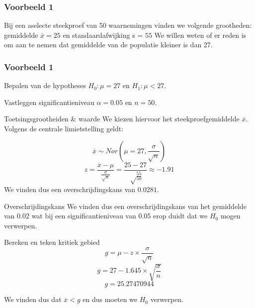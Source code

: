 \begin{frame}
	\frametitle{Voorbeeld 1}
	Bij een aselecte steekproef van 50 waarnemingen vinden we volgende grootheden: gemiddelde $\overline{x} = 25$ en standaardafwijking s = $55$
	We willen weten of er reden is om aan te nemen dat gemiddelde van de populatie kleiner is dan 27.
	
\end{frame}

\begin{frame}
	\frametitle{Voorbeeld 1}
	\begin{block}{Bepalen van de hypotheses}
		$H_{0} : \mu = 27$ en $H_{1}: \mu < 27$.
	\end{block}
	
	
	\begin{block}{Vastleggen significantieniveau}
		$\alpha = 0.05$ en $n=50$.
	\end{block}
	
	
	\begin{block}{Toetsingsgrootheiden \& waarde}
		We kiezen hiervoor het steekproefgemiddelde $\overline{x}$. Volgens de centrale limietstelling geldt:
		
		\[ \overline{x} \sim Nor(\mu = 27, \frac{\sigma}{\sqrt{n}}) \]
		\[ z = \frac{\overline{x} - \mu}{\frac{\sigma}{\sqrt{n}}} = \frac{25-27}{\sqrt\frac{55}{50}} \approx -1.91\]
		We vinden dus een overschrijdingskans van $0.0281$.
	\end{block}
\end{frame}

\begin{frame}
	\begin{block}{Overschrijdingskans}
		We vinden dus een overschrijdingskans van het gemiddelde van $0.02$ wat bij een significantieniveau van 0.05 erop duidt dat we $H_{0}$ mogen verwerpen.
	\end{block}
	
	\begin{block}{Bereken en teken kritiek gebied}
		\[ g = \mu - z \times \frac{\sigma}{\sqrt{n}} \]
		\[ g = 27 - 1.645 \times \sqrt{\frac{\sigma}{n}} \]
		\[ g = 25.27470944 \]
		
		We vinden dus dat $\overline{x} < g$ en dus moeten we $H_{0}$ verwerpen.
	\end{block}
	
\end{frame}

\begin{frame}
	\centering
\end{frame}

